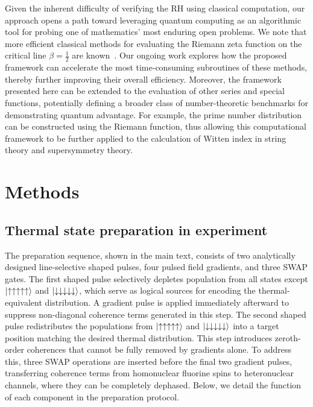 \documentclass[aps,pra,twocolumn,superscriptaddress,preprintnumbers,amsmath,amssymb]{revtex4-2}
\begin{document}
Given the inherent difficulty of verifying the RH using classical computation, our approach opens a path toward leveraging quantum computing as an algorithmic tool for probing one of mathematics’ most enduring open problems. We note that more efficient classical methods for evaluating the Riemann zeta function on the critical line $\beta=\tfrac{1}{2}$ are known~\cite{odlyzko200110,hiary2011fast}. Our ongoing work explores how the proposed framework can accelerate the most time-consuming subroutines of these methods, thereby further improving their overall efficiency. Moreover, the framework presented here can be extended to the evaluation of other series and special functions, potentially defining a broader class of number-theoretic benchmarks for demonstrating quantum advantage. For example, the prime number distribution can be constructed using the Riemann function, thus allowing this computational framework to be further applied to the calculation of Witten index in string theory and supersymmetry theory.
%
\clearpage
{}


 \clearpage

\section{Methods}
\subsection{Thermal state preparation in experiment}\label{Methods:Thermal state}
The preparation sequence, shown in the main text, consists of two analytically designed line-selective shaped pulses, four pulsed field gradients, and three SWAP gates. The first shaped pulse selectively depletes population from all states except $\ket{\uparrow\uparrow\uparrow\uparrow\uparrow}$ and $\ket{\downarrow\downarrow\downarrow\downarrow\downarrow}$, which serve as logical sources for encoding the thermal-equivalent distribution. A gradient pulse is applied immediately afterward to suppress non-diagonal coherence terms generated in this step. The second shaped pulse redistributes the populations from $\ket{\uparrow\uparrow\uparrow\uparrow\uparrow}$ and $\ket{\downarrow\downarrow\downarrow\downarrow\downarrow}$ into a target position matching the desired thermal distribution. This step introduces zeroth-order coherences that cannot be fully removed by gradients alone. To address this, three SWAP operations are inserted before the final two gradient pulses, transferring coherence terms from homonuclear fluorine spins to heteronuclear channels, where they can be completely dephased. Below, we detail the function of each component in the preparation protocol.
\end{document}
